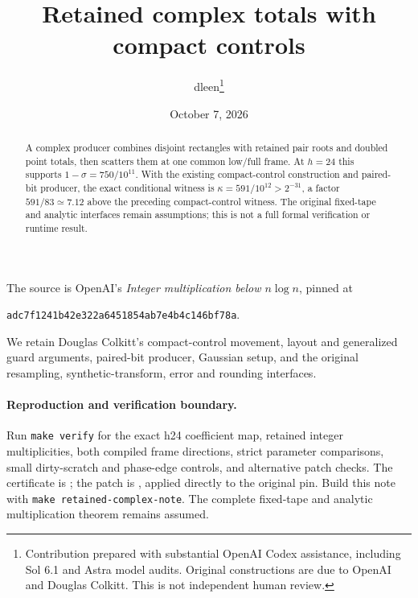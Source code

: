 \documentclass[11pt]{article}
\title{Retained complex totals with compact controls}
\author{dleen\thanks{Contribution prepared with substantial OpenAI Codex assistance,
including Sol 6.1 and Astra model audits. Original constructions are due to
OpenAI and Douglas Colkitt. This is not independent human review.}}
\date{October 7, 2026}
\begin{document}
\maketitle
\begin{abstract}
A complex producer combines disjoint rectangles with retained pair roots and doubled point totals,
then scatters them at one common low/full frame. At $h=24$ this supports
$1-\sigma=750/10^{11}$. With the existing compact-control construction and
paired-bit producer, the exact conditional witness is
$\kappa=591/10^{12}>2^{-31}$, a factor $591/83\simeq7.12$ above the preceding
compact-control witness. The original fixed-tape and analytic interfaces
remain assumptions; this is not a full formal verification or runtime result.
\end{abstract}
The source is OpenAI's \emph{Integer multiplication below $n\log n$}, pinned at
\begin{center}\small\texttt{adc7f1241b42e322a6451854ab7e4b4c146bf78a}.\end{center}
We retain Douglas Colkitt's compact-control movement, layout and generalized
guard arguments, paired-bit producer, Gaussian setup, and the original
resampling, synthetic-transform, error and rounding interfaces.

\paragraph{Reproduction and verification boundary.}
Run \texttt{make verify} for the exact h24 coefficient map, retained integer
multiplicities, both compiled frame directions, strict parameter comparisons,
small dirty-scratch and phase-edge controls, and alternative patch checks.
The certificate is ; the patch is
, applied directly to the original pin.
Build this note with \texttt{make retained-complex-note}.
The complete fixed-tape and analytic multiplication theorem remains assumed.
\end{document}

